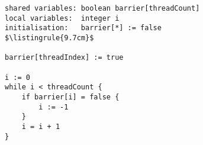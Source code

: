 \begin{center}
\begin{minipage}{\textwidth}
\begin{lstlisting}[mathescape, linewidth=9.7cm]
shared variables: boolean barrier[threadCount]
local variables:  integer i
initialisation:   barrier[*] := false
$\listingrule{9.7cm}$

barrier[threadIndex] := true

i := 0
while i < threadCount {
	if barrier[i] = false {
		i := -1
	}
	i = i + 1
}
\end{lstlisting}
\end{minipage}
\end{center}
